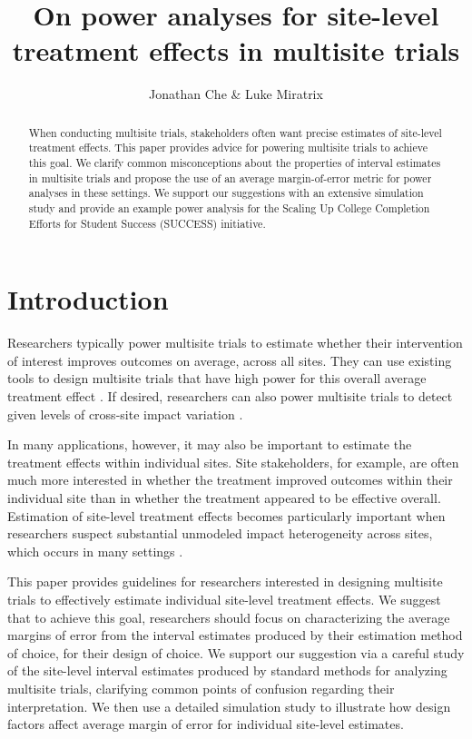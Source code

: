 \documentclass[]{article}
\title{On power analyses for site-level treatment effects in multisite trials}
\author{Jonathan Che \& Luke Miratrix}
\begin{document}
\maketitle


\begin{abstract}
    When conducting multisite trials, stakeholders often want precise estimates of site-level treatment effects.
    This paper provides advice for powering multisite trials to achieve this goal.
    We clarify common misconceptions about the properties of interval estimates in multisite trials and propose the use of an average margin-of-error metric for power analyses in these settings.
    We support our suggestions with an extensive simulation study and provide an example power analysis for the Scaling Up College Completion Efforts for Student Success (SUCCESS) initiative.
\end{abstract}

\section{Introduction}

Researchers typically power multisite trials to estimate whether their intervention of interest improves outcomes on average, across all sites.
They can use existing tools to design multisite trials that have high power for this overall average treatment effect \citep[e.g., ][]{hunter2021power, powerup}.
If desired, researchers can also power multisite trials to detect given levels of cross-site impact variation \citep[e.g.,][]{raudenbush2000statistical}.

In many applications, however, it may also be important to estimate the treatment effects within individual sites.
Site stakeholders, for example, are often much more interested in whether the treatment improved outcomes within their individual site than in whether the treatment appeared to be effective overall.
Estimation of site-level treatment effects becomes particularly important when researchers suspect substantial unmodeled impact heterogeneity across sites, which occurs in many settings \citep{weiss2017much}.

This paper provides guidelines for researchers interested in designing multisite trials to effectively estimate individual site-level treatment effects.
We suggest that to achieve this goal, researchers should focus on characterizing the average margins of error from the interval estimates produced by their estimation method of choice, for their design of choice.
We support our suggestion via a careful study of the site-level interval estimates produced by standard methods for analyzing multisite trials, clarifying common points of confusion regarding their interpretation.
We then use a detailed simulation study to illustrate how design factors affect average margin of error for individual site-level estimates.
\end{document}
